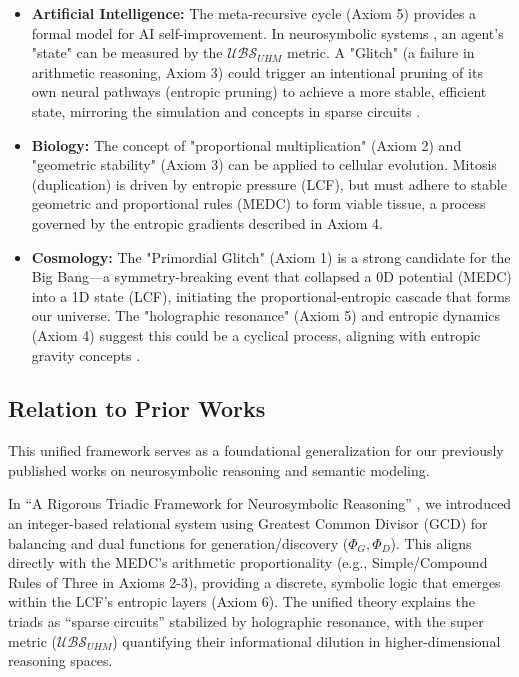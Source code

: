 \documentclass[11pt, a4paper]{article}
\begin{document}
		\begin{itemize}
			\item \textbf{Artificial Intelligence:} The meta-recursive cycle (Axiom 5) provides a formal model for AI self-improvement. In neurosymbolic systems \cite{Triadic}, an agent's "state" can be measured by the $\mathcal{UBS}_{UHM}$ metric. A "Glitch" (a failure in arithmetic reasoning, Axiom 3) could trigger an intentional pruning of its own neural pathways (entropic pruning) to achieve a more stable, efficient state, mirroring the simulation \cite{Garcez2023} and concepts in sparse circuits \cite{Anthropic_SparseCircuits, Triadic}.
			\item \textbf{Biology:} The concept of "proportional multiplication" (Axiom 2) and "geometric stability" (Axiom 3) can be applied to cellular evolution. Mitosis (duplication) is driven by entropic pressure (LCF), but must adhere to stable geometric and proportional rules (MEDC) to form viable tissue, a process governed by the entropic gradients described in Axiom 4.
			\item \textbf{Cosmology:} The "Primordial Glitch" (Axiom 1) is a strong candidate for the Big Bang—a symmetry-breaking event that collapsed a 0D potential (MEDC) into a 1D state (LCF), initiating the proportional-entropic cascade that forms our universe. The "holographic resonance" (Axiom 5) and entropic dynamics (Axiom 4) suggest this could be a cyclical process, aligning with entropic gravity concepts \cite{verlinde2010}.
		\end{itemize}
		
		\subsection{Relation to Prior Works}
		This unified framework serves as a foundational generalization for our previously published works on neurosymbolic reasoning and semantic modeling.
		
		In ``A Rigorous Triadic Framework for Neurosymbolic Reasoning'' \cite{Triadic}, we introduced an integer-based relational system using Greatest Common Divisor (GCD) for balancing and dual functions for generation/discovery ($\Phi_G, \Phi_D$). This aligns directly with the MEDC's arithmetic proportionality (e.g., Simple/Compound Rules of Three in Axioms 2-3), providing a discrete, symbolic logic that emerges within the LCF's entropic layers (Axiom 6). The unified theory explains the triads as ``sparse circuits'' stabilized by holographic resonance, with the super metric ($\mathcal{UBS}_{UHM}$) quantifying their informational dilution in higher-dimensional reasoning spaces.
		
\end{document}
